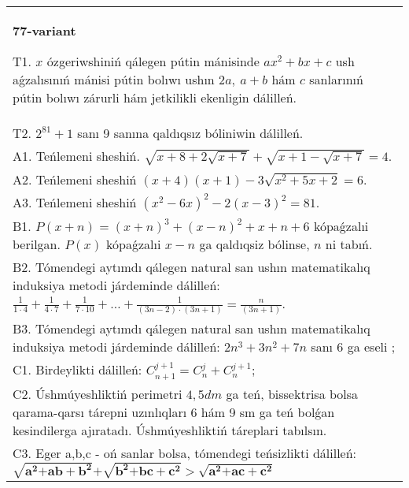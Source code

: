 \documentclass{article}
\begin{document}
\begin{tabular}{m{17cm}}
\textbf{77-variant}
\newline

T1. \(x\) ózgeriwshiniń qálegen pútin mánisinde \(ax^{2} + bx + c\) ush aǵzalısınıń mánisi pútin bolıwı ushın \(2a,\ a + b\) hám \(c\) sanlarınıń pútin bolıwı zárurli hám jetkilikli ekenligin dálilleń. \\
T2. \(2^{81} + 1\) sanı 9 sanına qaldıqsız bóliniwin dálilleń. \\
A1. Teńlemeni sheshiń. \(\sqrt{x + 8 + 2\sqrt{x + 7}} + \sqrt{x + 1 - \sqrt{x + 7}} = 4\). \\
A2. Teńlemeni sheshiń \((x + 4)(x + 1) - 3\sqrt{x^{2} + 5x + 2} = 6\). \\
A3. Teńlemeni sheshiń \(\left( x^{2} - 6x \right)^{2} - 2(x - 3)^{2} = 81\). \\
B1. \(P(x + n) = (x + n)^{3} + (x - n)^{2} + x + n + 6\) kópaǵzalıi berilgan. \(P(x)\) kópaǵzalıi \(x - n\) ga qaldıqsiz bólinse, \(n\) ni tabıń. \\
B2. Tómendegi aytımdı qálegen natural san ushın matematikalıq induksiya metodi járdeminde dálilleń: \(\frac{1}{1 \cdot 4} + \frac{1}{4 \cdot 7} + \frac{1}{7 \cdot 10} + \ldots + \frac{1}{(3n - 2) \cdot (3n + 1)} = \frac{n}{(3n + 1)}\). \\
B3. Tómendegi aytımdı qálegen natural san ushın matematikalıq induksiya metodi járdeminde dálilleń: \(2n^{3} + 3n^{2} + 7n\) sanı 6 ga eseli ; \\
C1. Birdeylikti dálilleń: \(C_{n + 1}^{j + 1} = C_{n}^{j} + C_{n}^{j + 1}\); \\
C2. Úshmúyeshliktiń perimetri \(4,5dm\) ga teń, bissektrisa bolsa qarama-qarsı tárepni uzınlıqları 6 hám 9 sm ga teń bolǵan kesindilerga ajıratadı. Úshmúyeshliktiń táreplari tabılsın. \\
C3. Eger a,b,c - oń sanlar bolsa, tómendegi teńsizlikti dálilleń: \(\sqrt{\mathbf{a}^{\mathbf{2}}\mathbf{+ ab +}\mathbf{b}^{\mathbf{2}}}\mathbf{+}\sqrt{\mathbf{b}^{\mathbf{2}}\mathbf{+ bc +}\mathbf{c}^{\mathbf{2}}}\mathbf{>}\sqrt{\mathbf{a}^{\mathbf{2}}\mathbf{+ ac +}\mathbf{c}^{\mathbf{2}}}\) \\

\end{tabular}
\vspace{1cm}
\end{document}
